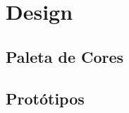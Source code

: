 \documentclass[../main.tex]{subfiles}
\begin{document}
\section{Design}
\subsection{Paleta de Cores}
\subsection{Protótipos}
\end{document}
